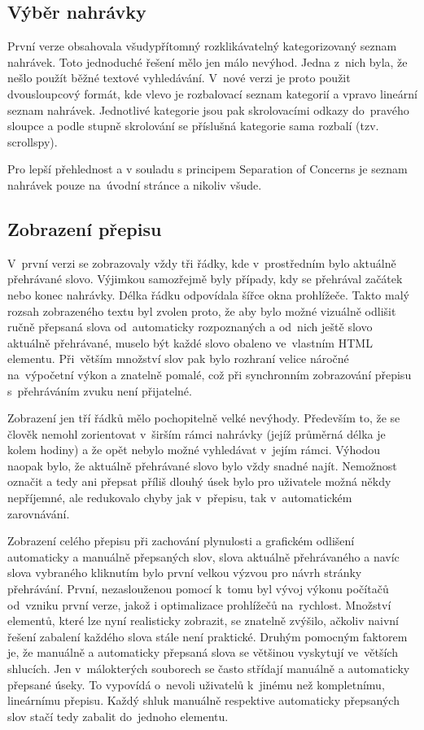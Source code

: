 \subsection{Výběr nahrávky}

První verze obsahovala všudypřítomný rozklikávatelný kategorizovaný seznam
nahrávek. Toto jednoduché řešení mělo jen málo nevýhod. Jedna z~nich byla, že
nešlo použít běžné textové vyhledávání. V~nové verzi je proto použit
dvousloupcový formát, kde vlevo je rozbalovací seznam kategorií a vpravo
lineární seznam nahrávek. Jednotlivé kategorie jsou pak skrolovacími odkazy
do~pravého sloupce a podle stupně skrolování se příslušná kategorie sama
rozbalí (tzv. scrollspy).

Pro lepší přehlednost a v souladu s principem Separation of Concerns je seznam
nahrávek pouze na~úvodní stránce a nikoliv všude.

\subsection{Zobrazení přepisu}

V~první verzi se zobrazovaly vždy tři řádky, kde v~prostředním bylo aktuálně
přehrávané slovo. Výjimkou samozřejmě byly případy, kdy se přehrával začátek
nebo konec nahrávky. Délka řádku odpovídala šířce okna prohlížeče. Takto malý
rozsah zobrazeného textu byl zvolen proto, že aby bylo možné vizuálně odlišit
ručně přepsaná slova od~automaticky rozpoznaných a od~nich ještě slovo aktuálně
přehrávané, muselo být každé slovo obaleno ve~vlastním HTML elementu. Při~větším
množství slov pak bylo rozhraní velice náročné na~výpočetní výkon a znatelně
pomalé, což při synchronním zobrazování přepisu s~přehráváním zvuku není
přijatelné.

Zobrazení jen tří řádků mělo pochopitelně velké nevýhody. Především to, že se
člověk nemohl zorientovat v~širším rámci nahrávky (jejíž průměrná délka je kolem
hodiny) a že opět nebylo možné vyhledávat v~jejím rámci. Výhodou naopak bylo, že
aktuálně přehrávané slovo bylo vždy snadné najít. Nemožnost označit a tedy ani
přepsat příliš dlouhý úsek bylo pro uživatele možná někdy nepříjemné, ale
redukovalo chyby jak v~přepisu, tak v~automatickém zarovnávání.

Zobrazení celého přepisu při zachování plynulosti a grafickém odlišení
automaticky a manuálně přepsaných slov, slova aktuálně přehrávaného a navíc
slova vybraného kliknutím bylo první velkou výzvou pro návrh stránky přehrávání.
První, nezaslouženou pomocí k~tomu byl vývoj výkonu počítačů od~vzniku první
verze, jakož i optimalizace prohlížečů na~rychlost. Množství elementů, které lze
nyní realisticky zobrazit, se znatelně zvýšilo, ačkoliv naivní řešení zabalení
každého slova stále není praktické. Druhým pomocným faktorem je, že manuálně a
automaticky přepsaná slova se většinou vyskytují ve~větších shlucích. Jen
v~málokterých souborech se často střídají manuálně a automaticky přepsané úseky.
To vypovídá o~nevoli uživatelů k~jinému než kompletnímu, lineárnímu přepisu.
Každý shluk manuálně respektive automaticky přepsaných slov stačí tedy zabalit
do~jednoho elementu.

